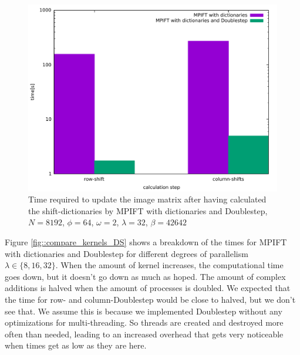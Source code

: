 \documentclass[12pt]{article}
\begin{document}
\begin{figure}[H]
	\includegraphics[width=380pt]{compare_with_Dic_to_DS_64}
	\caption{Time required to update the image matrix after having calculated the shift-dictionaries by MPIFT with dictionaries and Doublestep, $N=8192$, $\phi=64$, $\omega=2$, $\lambda=32$, $\beta=42642$}
	\label{fig::compare_Spift_DS}
\end{figure}

Figure \ref{fig::compare_kernels_DS} shows a breakdown of the times for MPIFT with dictionaries and Doublestep for different degrees of parallelism $\lambda\in\{8,16,32\}$. When the amount of kernel increases, the computational time goes down, but it doesn't go down as much as hoped. The amount of complex additions is halved when the amount of processes is doubled. We expected that the time for row- and column-Doublestep would be close to halved, but we don't see that. We assume this is because we implemented Doublestep without any optimizations for multi-threading. So threads are created and destroyed more often than needed, leading to an increased overhead that gets very noticeable when times get as low as they are here.
\end{document}
